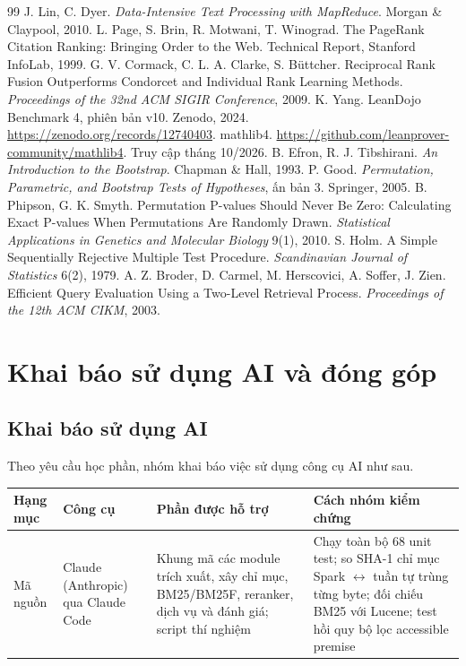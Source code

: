 \documentclass[11pt,a4paper,oneside]{report}
\renewcommand{\arraystretch}{1.15}
\begin{document}
\begin{thebibliography}{99}
 J. Lin, C. Dyer. \emph{Data-Intensive Text Processing with MapReduce}. Morgan \& Claypool, 2010.
 L. Page, S. Brin, R. Motwani, T. Winograd. The PageRank Citation Ranking: Bringing Order to the Web.
Technical Report, Stanford InfoLab, 1999.
 G. V. Cormack, C. L. A. Clarke, S. Büttcher. Reciprocal Rank Fusion Outperforms Condorcet and
Individual Rank Learning Methods. \emph{Proceedings of the 32nd ACM SIGIR Conference}, 2009.
 K. Yang. LeanDojo Benchmark 4, phiên bản v10. Zenodo, 2024. \url{https://zenodo.org/records/12740403}.
 mathlib4. \url{https://github.com/leanprover-community/mathlib4}. Truy cập tháng 10/2026.
 B. Efron, R. J. Tibshirani. \emph{An Introduction to the Bootstrap}. Chapman \& Hall, 1993.
 P. Good. \emph{Permutation, Parametric, and Bootstrap Tests of Hypotheses}, ấn bản 3. Springer, 2005.
 B. Phipson, G. K. Smyth. Permutation P-values Should Never Be Zero: Calculating Exact P-values When
Permutations Are Randomly Drawn. \emph{Statistical Applications in Genetics and Molecular Biology} 9(1), 2010.
 S. Holm. A Simple Sequentially Rejective Multiple Test Procedure. \emph{Scandinavian Journal of
Statistics} 6(2), 1979.
 A. Z. Broder, D. Carmel, M. Herscovici, A. Soffer, J. Zien. Efficient Query Evaluation Using a
Two-Level Retrieval Process. \emph{Proceedings of the 12th ACM CIKM}, 2003.
\end{thebibliography}
\endgroup

\appendix
\chapter{Khai báo sử dụng AI và đóng góp}\label{app:aicontrib}

\section{Khai báo sử dụng AI}\label{app:ai}

Theo yêu cầu học phần, nhóm khai báo việc sử dụng công cụ AI như sau.

\begin{center}
\renewcommand{\arraystretch}{1.3}
\begin{tabularx}{\linewidth}{|>{\raggedright\arraybackslash}p{2.15cm}|>{\raggedright\arraybackslash}p{3.1cm}|>{\raggedright\arraybackslash}p{4.4cm}|>{\raggedright\arraybackslash}X|}
\hline
\rowcolor{black!12}\textbf{Hạng mục} & \textbf{Công cụ} & \textbf{Phần được hỗ trợ} & \textbf{Cách nhóm kiểm chứng} \\
\hline
Mã nguồn & Claude (Anthropic) qua Claude Code & Khung mã các module trích xuất, xây chỉ mục, BM25/BM25F, reranker,
dịch vụ và đánh giá; script thí nghiệm & Chạy toàn bộ 68 unit test; so SHA-1 chỉ mục Spark $\leftrightarrow$ tuần tự trùng
từng byte; đối chiếu BM25 với Lucene; test hồi quy bộ lọc accessible premise \\
\hline
\end{tabularx}
\end{center}
\end{document}
